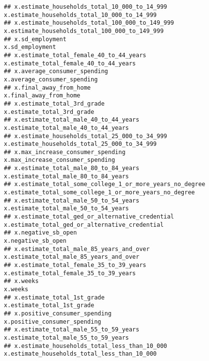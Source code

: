\documentclass[
]{article}
\begin{document}
\begin{verbatim}
## x.estimate_households_total_10_000_to_14_999                               x.estimate_households_total_10_000_to_14_999
## x.estimate_households_total_100_000_to_149_999                           x.estimate_households_total_100_000_to_149_999
## x.sd_employment                                                                                         x.sd_employment
## x.estimate_total_female_40_to_44_years                                           x.estimate_total_female_40_to_44_years
## x.average_consumer_spending                                                                 x.average_consumer_spending
## x.final_away_from_home                                                                           x.final_away_from_home
## x.estimate_total_3rd_grade                                                                   x.estimate_total_3rd_grade
## x.estimate_total_male_40_to_44_years                                               x.estimate_total_male_40_to_44_years
## x.estimate_households_total_25_000_to_34_999                               x.estimate_households_total_25_000_to_34_999
## x.max_increase_consumer_spending                                                       x.max_increase_consumer_spending
## x.estimate_total_male_80_to_84_years                                               x.estimate_total_male_80_to_84_years
## x.estimate_total_some_college_1_or_more_years_no_degree         x.estimate_total_some_college_1_or_more_years_no_degree
## x.estimate_total_male_50_to_54_years                                               x.estimate_total_male_50_to_54_years
## x.estimate_total_ged_or_alternative_credential                           x.estimate_total_ged_or_alternative_credential
## x.negative_sb_open                                                                                   x.negative_sb_open
## x.estimate_total_male_85_years_and_over                                         x.estimate_total_male_85_years_and_over
## x.estimate_total_female_35_to_39_years                                           x.estimate_total_female_35_to_39_years
## x.weeks                                                                                                         x.weeks
## x.estimate_total_1st_grade                                                                   x.estimate_total_1st_grade
## x.positive_consumer_spending                                                               x.positive_consumer_spending
## x.estimate_total_male_55_to_59_years                                               x.estimate_total_male_55_to_59_years
## x.estimate_households_total_less_than_10_000                               x.estimate_households_total_less_than_10_000

\end{verbatim}
\end{document}
